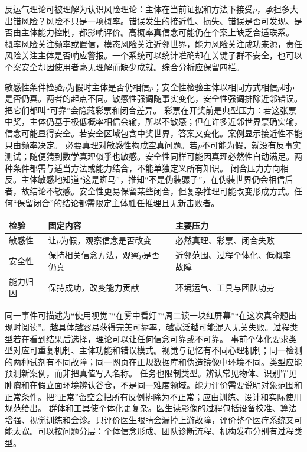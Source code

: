 反运气理论可被理解为认识风险理论：主体在当前证据和方法下接受$p$，承担多大出错风险？风险不只是一项概率。错误发生的接近性、损失、错误是否可发现、是否由主体能力控制，都影响评价。高概率真信念可能仍在个案上缺乏合适联系。 概率风险关注频率或置信，模态风险关注近邻世界，能力风险关注成功来源，责任风险关注主体是否响应警报。一个系统可以统计准确却在关键子群不安全，也可以个案安全却因使用者毫无理解而缺少成就。综合分析应保留四栏。

敏感性条件检验$p$为假时主体是否仍相信$p$；安全性检验主体以相同方式相信$p$时$p$是否仍真。两者的起点不同。敏感性强调随事实变化，安全性强调排除近邻错误。把它们都叫“可靠”会隐藏彩票和闭合差异。 彩票在开奖前是典型压力：若这张票中奖，主体仍基于极低概率相信会输，所以不敏感；但在许多近邻世界票确实输，信念可能显得安全。若安全区域包含中奖世界，答案又变化。案例显示接近性不能只由频率决定。 必要真理对敏感性构成空真问题。若$p$不可能为假，就没有反事实测试；随便猜到数学真理似乎也敏感。安全性同样可能因真理必然性自动满足。两种条件都需与适当方法或能力结合，不能单独定义所有知识。 闭合压力方向相反。主体敏感地知道“这是斑马”，推知“不是伪装骡子”，在伪装世界仍会相信后者，故结论不敏感。安全性更易保留某些闭合，但复杂推理可能改变形成方式。任何“保留闭合”的结论都需限定主体胜任推理且无新击败者。

\begin{center}
\begin{tabularx}{\textwidth}{@{}p{2.3cm}XX@{}}
\toprule
检验 & 固定内容 & 主要压力\\
\midrule
敏感性 & 让$p$为假，观察信念是否改变 & 必然真理、彩票、闭合失败\\
安全性 & 保持相关信念方法，观察$p$是否仍真 & 近邻范围、过程个体化、低概率故障\\
能力归因 & 保持成功，改变能力贡献 & 环境运气、工具与团队功劳\\
\bottomrule
\end{tabularx}
\end{center}

同一事件可描述为“使用视觉”“在雾中看灯”“周二读一块红屏幕”“在这次真命题出现时阅读”。越具体越容易获得完美可靠率，越宽泛越可能混入无关失败。过程类型若在看到结果后选择，理论可以让任何信念可靠或不可靠。 事前个体化要求类型对应可重复机制、主体功能和错误模式。视觉与记忆有不同心理机制；同一检测的两种试剂有不同故障；同一网页在正规数据库和伪造镜像中环境不同。类型应能预测新案例，而非把真值写入名称。 任务也限制类型。辨认常见物体、识别罕见肿瘤和在假立面环境辨认谷仓，不是同一难度领域。能力评价需要说明对象范围和正常条件。把“正常”留空会把所有反例排除为不正常；应由训练、设计和实际使用规范给出。 群体和工具使个体化更复杂。医生读影像的过程包括设备校准、算法增强、视觉训练和会诊。只评价医生眼睛会漏掉上游故障，评价整个医疗系统又可能太宽。可以按问题分层：个体信念形成、团队诊断流程、机构发布分别有过程类型。

